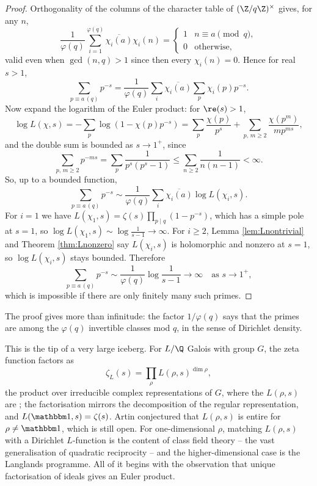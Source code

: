 \begin{proof}
	Orthogonality of the columns of the character table of $(\Z/q\Z)^\times$ gives, for any $n$,
	$$\frac{1}{\varphi(q)}\sum_{i=1}^{\varphi(q)}\overline{\chi_i(a)}\chi_i(n) = \begin{cases}1 & n\equiv a \pmod q,\\ 0 & \text{otherwise},\end{cases}$$
	valid even when $\gcd(n,q)>1$ since then every $\chi_i(n) = 0$. Hence for real $s > 1$,
	$$\sum_{p \equiv a\, (q)}p^{-s} = \frac1{\varphi(q)}\sum_{i}\overline{\chi_i(a)}\sum_p\chi_i(p)p^{-s}.$$
	Now expand the logarithm of the Euler product: for $\re(s)>1$,
	$$\log L(\chi,s) = -\sum_p\log\left(1-\chi(p)p^{-s}\right) = \sum_{p}\frac{\chi(p)}{p^s} + \sum_{p,\, m\ge2}\frac{\chi(p^m)}{mp^{ms}},$$
	and the double sum is bounded as $s \to 1^+$, since
	$$\sum_{p,\,m\ge2}p^{-ms} = \sum_p\frac{1}{p^s(p^s-1)} \le \sum_{n\ge2}\frac{1}{n(n-1)} < \infty.$$
	So, up to a bounded function,
	$$\sum_{p\equiv a\,(q)}p^{-s} \sim \frac1{\varphi(q)}\sum_i\overline{\chi_i(a)}\log L(\chi_i,s).$$
	For $i = 1$ we have $L(\chi_1,s) = \zeta(s)\prod_{p\mid q}(1-p^{-s})$, which has a simple pole at $s=1$, so $\log L(\chi_1,s)\sim\log\frac1{s-1}\to\infty$. For $i \geq 2$, Lemma \ref{lem:Lnontrivial} and Theorem \ref{thm:Lnonzero} say $L(\chi_i,s)$ is holomorphic and nonzero at $s = 1$, so $\log L(\chi_i,s)$ stays bounded. Therefore
	$$\sum_{p\equiv a\,(q)}p^{-s} \sim \frac{1}{\varphi(q)}\log\frac1{s-1} \longrightarrow \infty \quad\text{as } s\to1^+,$$
	which is impossible if there are only finitely many such primes.
\end{proof}

The proof gives more than infinitude: the factor $1/\varphi(q)$ says that the primes are  among the $\varphi(q)$ invertible classes mod $q$, in the sense of Dirichlet density.

\begin{remark}
	This is the tip of a very large iceberg. For $L/\Q$ Galois with group $G$, the zeta function factors as
	$$\zeta_L(s) = \prod_{\rho}L(\rho,s)^{\dim\rho},$$
	the product over irreducible complex representations of $G$, where the $L(\rho,s)$ are ; the factorisation mirrors the decomposition of the regular representation, and $L(\mathbbm 1, s) = \zeta(s)$. Artin conjectured that $L(\rho,s)$ is entire for $\rho \neq \mathbbm 1$, which is still open. For one-dimensional $\rho$, matching $L(\rho,s)$ with a Dirichlet $L$-function is the content of class field theory -- the vast generalisation of quadratic reciprocity -- and the higher-dimensional case is the Langlands programme. All of it begins with the observation that unique factorisation of ideals gives an Euler product.
\end{remark}

